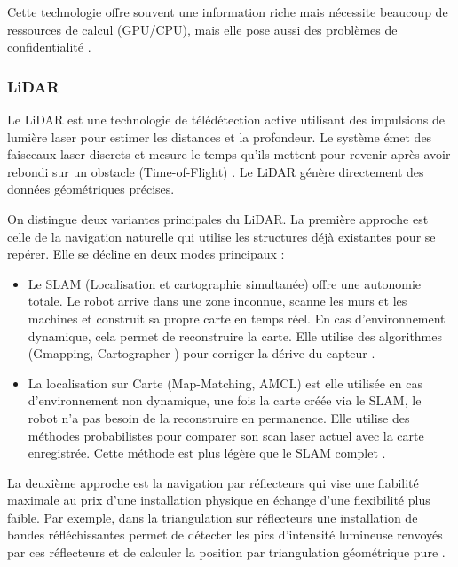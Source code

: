 \documentclass[11pt, a4paper]{article}
\begin{document}
Cette technologie offre souvent une information riche mais nécessite beaucoup de ressources de calcul (GPU/CPU), mais elle pose aussi des problèmes de confidentialité \cite{chenUpViewVisualBasedIndoor2024}.

\subsubsection{LiDAR}

Le LiDAR est une technologie de télédétection active utilisant des impulsions de lumière laser pour estimer les distances et la profondeur. Le système émet des faisceaux laser discrets et mesure le temps qu'ils mettent pour revenir après avoir rebondi sur un obstacle (Time-of-Flight) \cite{huangIndoorPositioningSystems2023}. Le LiDAR génère directement des données géométriques précises.

On distingue deux variantes principales du LiDAR. La première approche est celle de la navigation naturelle qui utilise les structures déjà existantes pour se repérer. Elle se décline en deux modes principaux :

\begin{itemize}
	\item Le SLAM (Localisation et cartographie simultanée) offre une autonomie totale. Le robot arrive dans une zone inconnue, scanne les murs et les machines et construit sa propre carte en temps réel. En cas d’environnement dynamique, cela permet de reconstruire la carte. Elle utilise des algorithmes (Gmapping, Cartographer ) pour corriger la dérive du capteur \cite{sesyukSurvey3DIndoor2022}.
	\item La localisation sur Carte (Map-Matching, AMCL)  est elle utilisée en cas d’environnement non dynamique, une fois la carte créée via le SLAM, le robot n'a pas besoin de la reconstruire en permanence. Elle utilise des méthodes probabilistes  pour comparer son scan laser actuel avec la carte enregistrée. Cette méthode est plus légère que le SLAM complet \cite{huangIndoorPositioningSystems2023}.
\end{itemize}

La deuxième approche est la navigation par réflecteurs qui vise une fiabilité maximale au prix d'une installation physique en échange d’une flexibilité plus faible. Par exemple, dans la triangulation sur réflecteurs une installation de bandes réfléchissantes permet de détecter les pics d’intensité lumineuse renvoyés par ces réflecteurs et de calculer la position par triangulation géométrique pure \cite{sesyukSurvey3DIndoor2022}.
\end{document}
